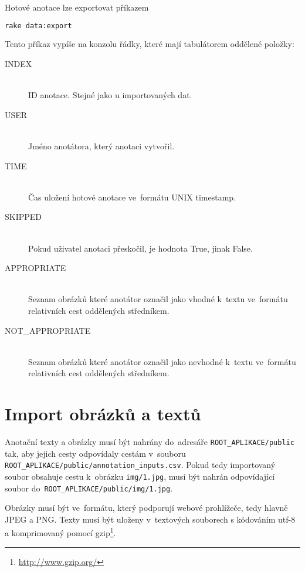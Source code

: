 Hotové anotace lze exportovat příkazem

\begin{lstlisting}[language=bash]
rake data:export
\end{lstlisting}

Tento příkaz vypíše na konzolu řádky, které mají tabulátorem oddělené položky:

\begin{description}

\item[INDEX] \hfill \\
  ID anotace. Stejné jako u importovaných dat.
\item[USER] \hfill \\
  Jméno anotátora, který anotaci vytvořil.
\item[TIME] \hfill \\
  Čas uložení hotové anotace ve~formátu UNIX timestamp.
\item[SKIPPED] \hfill \\
  Pokud uživatel anotaci přeskočil, je hodnota True, jinak False.
\item[APPROPRIATE] \hfill \\
  Seznam obrázků které anotátor označil jako vhodné k~textu ve~formátu relativních cest oddělených středníkem.
\item[NOT\_APPROPRIATE] \hfill \\
  Seznam obrázků které anotátor označil jako nevhodné k~textu ve~formátu relativních cest oddělených středníkem.

\end{description}

\section{Import obrázků a textů}

Anotační texty a obrázky musí být nahrány do~adresáře \lstinline{ROOT_APLIKACE/public} tak, aby jejich cesty odpovídaly cestám v~souboru \\ \lstinline{ROOT_APLIKACE/public/annotation_inputs.csv}. Pokud tedy importovaný soubor obsahuje cestu k~obrázku \lstinline{img/1.jpg}, musí být nahrán odpovídající soubor do~\lstinline{ROOT_APLIKACE/public/img/1.jpg}.

Obrázky musí být ve~formátu, který podporují webové prohlížeče, tedy hlavně JPEG a PNG. Texty musí být uloženy v~textových souborech s kódováním utf-8 a komprimovaný pomocí gzip\footnote{\url{http://www.gzip.org/}}.

